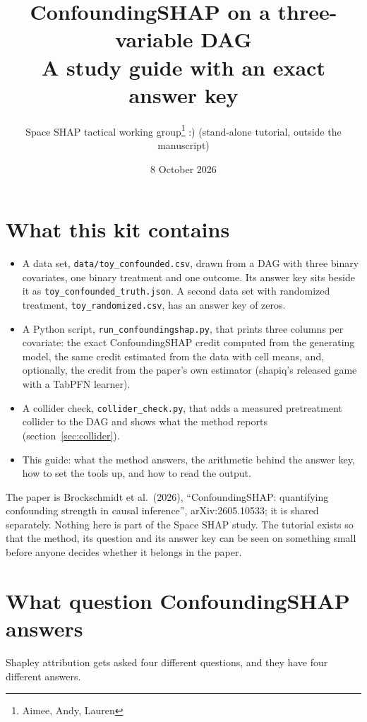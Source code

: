 \documentclass[10pt,letterpaper]{article}
\title{\bfseries ConfoundingSHAP on a three-variable DAG\\[4pt]\large A study guide with an exact answer key}
\author{Space SHAP tactical working group\footnote{Aimee, Andy, Lauren} :)  \quad (stand-alone tutorial, outside the manuscript)}
\date{8 October 2026}
\begin{document}
\maketitle

\section*{What this kit contains}
\begin{itemize}\setlength{\itemsep}{1pt}
\item A data set, \texttt{data/toy\_confounded.csv}, drawn from a DAG with three binary covariates, one binary treatment and one outcome. Its answer key sits beside it as \texttt{toy\_confounded\_truth.json}. A second data set with randomized treatment, \texttt{toy\_randomized.csv}, has an answer key of zeros.
\item A Python script, \texttt{run\_confoundingshap.py}, that prints three columns per covariate: the exact ConfoundingSHAP credit computed from the generating model, the same credit estimated from the data with cell means, and, optionally, the credit from the paper's own estimator (shapiq's released game with a TabPFN learner).
\item A collider check, \texttt{collider\_check.py}, that adds a measured pretreatment collider to the DAG and shows what the method reports (section~\ref{sec:collider}).
\item This guide: what the method answers, the arithmetic behind the answer key, how to set the tools up, and how to read the output.
\end{itemize}
The paper is Brockschmidt et al.\ (2026), ``ConfoundingSHAP: quantifying confounding strength in causal inference'', arXiv:2605.10533; it is shared separately. Nothing here is part of the Space SHAP study. The tutorial exists so that the method, its question and its answer key can be seen on something small before anyone decides whether it belongs in the paper.

\section{What question ConfoundingSHAP answers}
Shapley attribution gets asked four different questions, and they have four different answers.
\end{document}

